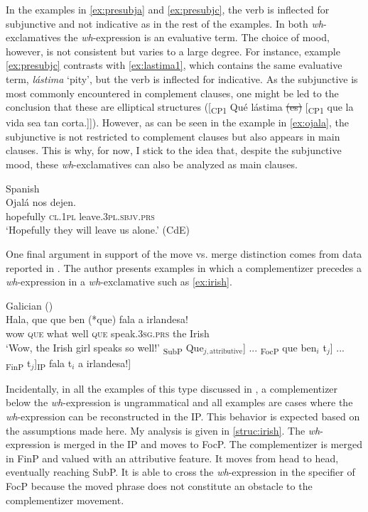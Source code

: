 In the examples in \eqref{ex:presubja} and \eqref{ex:presubjc}, the verb  is inflected for subjunctive and not indicative as in the rest of the examples. In both \textit{wh}-exclamatives the \textit{wh}-expression is an evaluative term. The choice of mood, however, is not consistent but varies to a large degree. For instance,  example \eqref{ex:presubjc} contrasts with \eqref{ex:lastima1}, which contains the same evaluative term, \emph{lástima} `pity', but the  verb is inflected for indicative.  As the subjunctive is most commonly encountered in complement clauses, one might be led to the conclusion that these are elliptical structures ([\textsubscript{CP1} Qué lástima \sout{(es)} [\textsubscript{CP1} que la vida sea tan corta.]]). However, as can be seen in the example in \eqref{ex:ojala}, the subjunctive is not restricted to complement clauses but also appears in main clauses. This is why, for now, I stick to the idea that, despite the subjunctive mood,  these \textit{wh}-exclamatives can also be analyzed as main clauses.

\ea\label{ex:ojala}
Spanish\\
\gll Ojalá nos dejen. \\
hopefully \textsc{cl.1pl} leave.\textsc{3pl.sbjv.prs}\\
\glt `Hopefully they will leave us alone.' (CdE)
\z

One final argument in support of the move vs. merge distinction comes from data reported in \citet{Corr2016}. The author presents examples in which a complementizer precedes a \textit{wh}-expression in a \textit{wh}-exclamative such as \eqref{ex:irish}.

\ea\label{ex:irish} Galician (\citealt[90: ex 24]{Corr2016})\\ \gll Hala, que que ben (*que) fala a irlandesa!\\
wow \textsc{que} what well \textsc{que} speak.\textsc{3sg.prs} the Irish\\
\glt `Wow, the Irish girl speaks so well!' 
\ex\label{struc:irish} {\ob}\textsubscript{SubP} Que$_{j,\text{attributive}}$] ... {\ob}\textsubscript{FocP} que ben$_i$ t$_j$] ... {\ob}\textsubscript{FinP} t$_j$]{\ob}\textsubscript{IP}  fala t$_i$ a  irlandesa!]
\z

Incidentally, in all the examples of this type discussed in \citet{Corr2016},  a complementizer below the \textit{wh}-expression is ungrammatical and   all examples are cases where the \textit{wh}-expression can be reconstructed in the IP. This behavior is expected based on the assumptions made here. My  analysis is given in \eqref{struc:irish}. The \textit{wh}-expression is merged in the IP and moves to FocP.  The complementizer is merged in FinP and valued with an attributive feature. It moves from head to head, eventually reaching SubP. It is able to cross the \textit{wh}-expression in the specifier of FocP because the moved phrase does not constitute an obstacle to the complementizer movement. 


